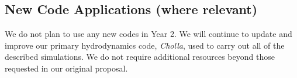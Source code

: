\documentclass[11pt,letterpaper,english]{article}
\begin{document}
\subsection{New Code Applications (where relevant)} 





We do not plan to use any new codes in Year 2. We will continue to update and improve our primary hydrodynamics code, \textit{Cholla}, used to carry out all of the described simulations. We do not require additional
resources beyond those requested in our original proposal.
\end{document}
